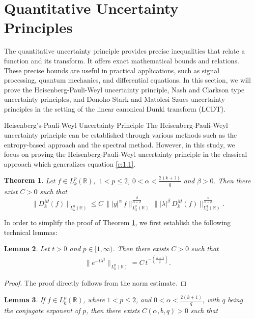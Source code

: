 \documentclass[12pt,a4paper,reqno]{amsproc}
\newtheorem{theorem}{Theorem}[section]
\newtheorem{lemma}[theorem]{Lemma}
\theoremstyle{definition}
\theoremstyle{remark}
\numberwithin{equation}{section}
\begin{document}
\section{Quantitative Uncertainty Principles}\label{s:5}
The quantitative uncertainty principle provides precise inequalities that relate a function and its transform. It offers exact mathematical bounds and relations. These precise bounds are useful in practical applications, such as signal processing, quantum mechanics, and differential equations. In this section, we will prove the Heisenberg-Pauli-Weyl uncertainty principle, Nash and Clarkson type uncertainty principles, and Donoho-Stark and Matolcsi-Szucs uncertainty principles in the setting of the linear canonical Dunkl transform (LCDT).
\begin{subsection}{Heisenberg's-Pauli-Weyl Uncertainty Principle}
The Heisenberg-Pauli-Weyl uncertainty principle \cite{soltani2013heisenberg}  can be established through various methods such as the entropy-based approach and the spectral method. However, in this study, we focus on proving the Heisenberg-Pauli-Weyl uncertainty principle in the classical approach which generalizes equation \eqref{e:1.1}.
\begin{theorem}\label{t:4.3}
Let $f\in L^p_k(\mathbb{R})$, \,$1<p\le2$, $0<\alpha<\frac{2(k+1)}{q}$ and $\beta>0$. Then there exist $C>0$  such that 
\begin{equation*}
\|D_k^M(f)\|_{L^{q}_k(\mathbb{R})} \le C\, \||y|^\alpha\,f\|^{\frac{\beta}{\alpha+\beta}}_{L_k^p(\mathbb{R})}\, \||\lambda|^\beta\, D_k^M(f)\|^{\frac{\alpha}{\alpha+\beta}}_{L_k^{q}(\mathbb{R})} .
\end{equation*}
\end{theorem}
In order to simplify the proof of Theorem \ref{t:4.3}, we first establish the following technical lemmas:
\begin{lemma}\label{l:5.1}
    Let $t>0$ and  $p\in [1,\infty)$. Then there exists $C>0$ such that
    \begin{eqnarray*}
\|e^{-t\lambda^2}\|_{L^p_k(\mathbb{R})} =C\, t^{-\left(\frac{k+1}{p}\right)}.
    \end{eqnarray*}
\end{lemma} 
\begin{proof}
    The proof directly follows from the norm estimate.
\end{proof}
\begin{lemma}\label{l:6.2}
    If  $f\in L_k^p(\mathbb{R})$, where $1<p\le2$, and $0<\alpha< \frac{2(k+1)}{q}$, with $q$ being the conjugate exponent of $p$, then there exists  $C(\alpha,b,q)>0$ such that 

\end{lemma}
\end{subsection}
\end{document}
